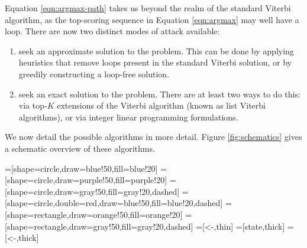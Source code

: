 Equation \ref{eqn:argmax-path} takes us beyond the realm of the standard Viterbi algorithm, as the top-scoring sequence in Equation \ref{eqn:argmax} may well have a loop.
There are now two distinct modes of attack available:
\begin{enumerate}
	\item seek an approximate solution to the problem.
	This can be done by applying heuristics that remove loops present in the standard Viterbi solution,
	or by greedily constructing a loop-free solution.

	\item seek an exact solution to the problem.
	There are at least two ways to do this:
	via top-$K$ extensions of the Viterbi algorithm (known as list Viterbi algorithms),
	or via integer linear programming formulations.
\end{enumerate}
We now detail the possible algorithms in more detail.
Figure \ref{fig:schematics} gives a schematic overview of these algorithms.

=[shape=circle,draw=blue!50,fill=blue!20]
=[shape=circle,draw=purple!50,fill=purple!20]
=[shape=circle,draw=gray!50,fill=gray!20,dashed]
=[shape=circle,double=red,draw=blue!50,fill=blue!20,dashed]
=[shape=rectangle,draw=orange!50,fill=orange!20]
=[shape=rectangle,draw=gray!50,fill=gray!20,dashed]
=[<-,thin]
=[state,thick]
=[<-,thick]


